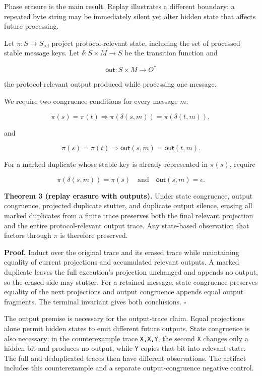 \documentclass[10pt,a4paper]{article}
\begin{document}
Phase erasure is the main result. Replay illustrates a different
boundary: a repeated byte string may be immediately silent yet alter
hidden state that affects future processing.

Let \(\pi:S\to S_{\mathrm{rel}}\) project protocol-relevant state,
including the set of processed stable message keys. Let
\(\delta:S\times M\to S\) be the transition function and

\[
\mathsf{out}:S\times M\to O^*
\]

the protocol-relevant output produced while processing one message.

We require two congruence conditions for every message \(m\):

\[
\pi(s)=\pi(t)
\Rightarrow
\pi(\delta(s,m))=\pi(\delta(t,m)),
\tag{state congruence}
\]

and

\[
\pi(s)=\pi(t)
\Rightarrow
\mathsf{out}(s,m)=\mathsf{out}(t,m).
\tag{output congruence}
\]

For a marked duplicate whose stable key is already represented in
\(\pi(s)\), require

\[
\pi(\delta(s,m))=\pi(s)
\quad\text{and}\quad
\mathsf{out}(s,m)=\epsilon.
\]

\textbf{Theorem 3 (replay erasure with outputs).} Under state
congruence, output congruence, projected duplicate stutter, and
duplicate output silence, erasing all marked duplicates from a finite
trace preserves both the final relevant projection and the entire
protocol-relevant output trace. Any state-based observation that factors
through \(\pi\) is therefore preserved.

\textbf{Proof.} Induct over the original trace and its erased trace
while maintaining equality of current projections and accumulated
relevant outputs. A marked duplicate leaves the full execution's
projection unchanged and appends no output, so the erased side may
stutter. For a retained message, state congruence preserves equality of
the next projections and output congruence appends equal output
fragments. The terminal invariant gives both conclusions. \(\square\)

The output premise is necessary for the output-trace claim. Equal
projections alone permit hidden states to emit different future outputs.
State congruence is also necessary: in the counterexample trace
\texttt{X,X,Y}, the second \texttt{X} changes only a hidden bit and
produces no output, while \texttt{Y} copies that bit into relevant
state. The full and deduplicated traces then have different
observations. The artifact includes this counterexample and a separate
output-congruence negative control.
\end{document}
